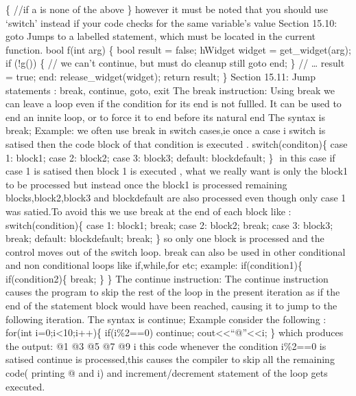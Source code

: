 \{ //if a is none of the above \} however it must be noted that you
should use `switch' instead if your code checks for the same variable's
value Section 15.10: goto Jumps to a labelled statement, which must be
located in the current function. bool f(int arg) \{ bool result = false;
hWidget widget = get\_widget(arg); if (!g()) \{ // we can't continue,
but must do cleanup still goto end; \} // \ldots{} result = true; end:
release\_widget(widget); return result; \} Section 15.11: Jump
statements : break, continue, goto, exit The break instruction: Using
break we can leave a loop even if the condition for its end is not
fullled. It can be used to end an innite loop, or to force it to end
before its natural end The syntax is break; Example: we often use break
in switch cases,ie once a case i switch is satised then the code block
of that condition is executed . switch(conditon)\{ case 1: block1; case
2: block2; case 3: block3; default: blockdefault; \} in this case if
case 1 is satised then block 1 is executed , what we really want is only
the block1 to be processed but instead once the block1 is processed
remaining blocks,block2,block3 and blockdefault are also processed even
though only case 1 was satied.To avoid this we use break at the end of
each block like : switch(condition)\{ case 1: block1; break; case 2:
block2; break; case 3: block3; break; default: blockdefault; break; \}
so only one block is processed and the control moves out of the switch
loop. break can also be used in other conditional and non conditional
loops like if,while,for etc; example: if(condition1)\{ if(condition2)\{
break; \} \} The continue instruction: The continue instruction causes
the program to skip the rest of the loop in the present iteration as if
the end of the statement block would have been reached, causing it to
jump to the following iteration. The syntax is continue; Example
consider the following : for(int i=0;i\textless10;i++)\{ if(i\%2==0)
continue; cout\textless\textless{}``\n @''\textless\textless i; \} which
produces the output: @1 @3 @5 @7 @9 i this code whenever the condition
i\%2==0 is satised continue is processed,this causes the compiler to
skip all the remaining code( printing @ and i) and increment/decrement
statement of the loop gets executed.
